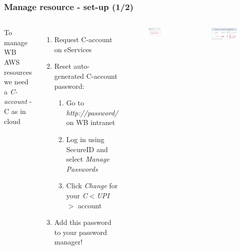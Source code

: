 \documentclass[aspectratio=169]{beamer} %
\begin{document}
\begin{frame}
	\frametitle{Manage resource - set-up (1/2)}
	\begin{columns}[c]


		To manage WB AWS resources we need a \textit{C-account} - C as in cloud

		\begin{enumerate}
			\item Request C-account on eServices
			\item Reset auto-generated C-account password:
			\begin{enumerate}
				\item Go to \textit{http://password/} on WB intranet
				\item Log in using SecureID and select \textit{Manage Passwords}
				\item Click \textit{Change} for your \textit{C$<$UPI$>$} account
			\end{enumerate}
			\item Add this password to your password manager!
		\end{enumerate}

		\begin{figure}
			\centering
			\includegraphics[width=.5\textwidth]{./img/password-1.png}
		\end{figure}
		\vspace{.2cm}
		\begin{figure}
			\centering
			\includegraphics[width=1\textwidth]{./img/password-2.png}
		\end{figure}

	\end{columns}
\end{frame}
\end{document}
